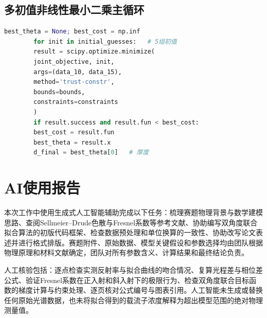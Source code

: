 \documentclass[12pt,a4paper]{ctexart}
\begin{document}
	\subsection{多初值非线性最小二乘主循环}
	\begin{lstlisting}[language=Python, caption=多初值优化与最佳解选择]
		best_theta = None; best_cost = np.inf
		for init in initial_guesses:   # 5组初值
		result = scipy.optimize.minimize(
		joint_objective, init,
		args=(data_10, data_15),
		method='trust-constr',
		bounds=bounds,
		constraints=constraints
		)
		if result.success and result.fun < best_cost:
		best_cost = result.fun
		best_theta = result.x
		d_final = best_theta[0]   # 厚度
	\end{lstlisting}
	
	\newpage
	\section*{AI使用报告}
	
	本次工作中使用生成式人工智能辅助完成以下任务：梳理赛题物理背景与数学建模思路、查阅Sellmeier–Drude色散与Fresnel系数等参考文献、协助编写双角度联合拟合算法的初版代码框架、检查数据预处理和单位换算的一致性、协助改写论文表述并进行格式排版。赛题附件、原始数据、模型关键假设和参数选择均由团队根据物理原理和材料文献确定，团队对所有参数含义、计算结果和最终结论负责。
	
	人工核验包括：逐点检查实测反射率与拟合曲线的吻合情况、复算光程差与相位差公式、验证Fresnel系数在正入射和斜入射下的极限行为、检查双角度联合目标函数的梯度计算与约束处理、逐页核对公式编号与图表引用。人工智能未生成或替换任何原始光谱数据，也未将拟合得到的载流子浓度解释为超出模型范围的绝对物理测量值。
	
\end{document}
